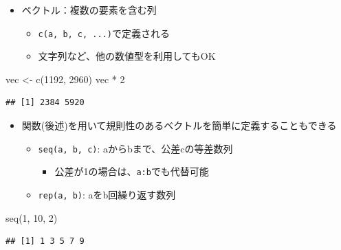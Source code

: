 \documentclass[
]{ltjsarticle}
\newenvironment{Shaded}{\begin{snugshade}}{\end{snugshade}}
\newcommand{\DecValTok}[1]{\textcolor[rgb]{0.00,0.00,0.81}{#1}}
\newcommand{\FunctionTok}[1]{\textcolor[rgb]{0.00,0.00,0.00}{#1}}
\newcommand{\NormalTok}[1]{#1}
\newcommand{\OtherTok}[1]{\textcolor[rgb]{0.56,0.35,0.01}{#1}}
\newcommand{\SpecialCharTok}[1]{\textcolor[rgb]{0.00,0.00,0.00}{#1}}
\providecommand{\tightlist}{%
  \setlength{\itemsep}{0pt}\setlength{\parskip}{0pt}}
\begin{document}
\begin{itemize}
\tightlist
\item
  ベクトル：複数の要素を含む列

  \begin{itemize}
  \tightlist
  \item
    \texttt{c(a,\ b,\ c,\ ...)}で定義される
  \item
    文字列など、他の数値型を利用してもOK
  \end{itemize}
\end{itemize}

\begin{Shaded}
\begin{Highlighting}[]
\NormalTok{vec }\OtherTok{\textless{}{-}} \FunctionTok{c}\NormalTok{(}\DecValTok{1192}\NormalTok{, }\DecValTok{2960}\NormalTok{)}
\NormalTok{vec }\SpecialCharTok{*} \DecValTok{2}
\end{Highlighting}
\end{Shaded}

\begin{verbatim}
## [1] 2384 5920
\end{verbatim}

\begin{itemize}
\tightlist
\item
  関数(後述)を用いて規則性のあるベクトルを簡単に定義することもできる

  \begin{itemize}
  \tightlist
  \item
    \texttt{seq(a,\ b,\ c)}: aからbまで、公差cの等差数列

    \begin{itemize}
    \tightlist
    \item
      公差が1の場合は、\texttt{a:b}でも代替可能
    \end{itemize}
  \item
    \texttt{rep(a,\ b)}: aをb回繰り返す数列
  \end{itemize}
\end{itemize}

\begin{Shaded}
\begin{Highlighting}[]
\FunctionTok{seq}\NormalTok{(}\DecValTok{1}\NormalTok{, }\DecValTok{10}\NormalTok{, }\DecValTok{2}\NormalTok{)}
\end{Highlighting}
\end{Shaded}

\begin{verbatim}
## [1] 1 3 5 7 9
\end{verbatim}
\end{document}
